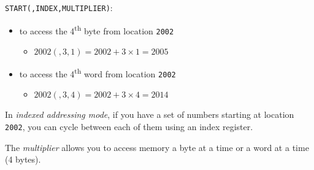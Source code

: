 \begin{frame}[fragile=singleslide]
  \begin{minipage}{.65\linewidth}
    \begin{block}{\texttt{START(,INDEX,MULTIPLIER)}:}
      \begin{itemize}
      \item to access the 4\textsuperscript{th} byte from location \texttt{2002}
        \begin{itemize}
        \item[] $2002(,3,1) = 2002+3\times{}1 = 2005$
        \end{itemize}
      \item to access the 4\textsuperscript{th} word from location \texttt{2002}
        \begin{itemize}
        \item[] $2002(,3,4)= 2002+3\times{}4 = 2014$
        \end{itemize}
      \end{itemize}
    \end{block}
  \end{minipage}\hfill
  \begin{minipage}{.29\linewidth}
    \begin{center}
    \end{center}
  \end{minipage}
\end{frame}

In \emph{indexed addressing mode}, if you have a set of numbers starting at location
\texttt{2002}, you can cycle between each of them using an index register.

The \emph{multiplier} allows you to access memory a byte at a time or a word at a time (4
bytes).

